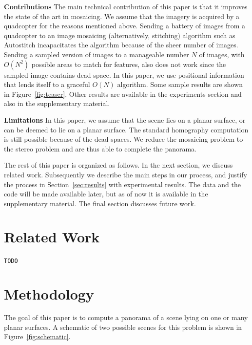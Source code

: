 \documentclass[10pt,twocolumn,letterpaper]{article}
\begin{document}
{\bf Contributions} The main technical contribution of this paper is
that it improves the state of the art in mosaicing.  We assume that
the imagery is acquired by a quadcopter for the reasons mentioned
above. Sending a battery of images from a quadcopter to an image
mosaicing (alternatively, stitching) algorithm such as Autostitch
incapacitates the algorithm because of the sheer number of
images. Sending a sampled version of images to a manageable number $N$
of images, with $O(N^2)$ possible areas to match for features, also
does not work since the sampled image contains dead space.  In this
paper, we use positional information that lends itself to a graceful
$O(N)$ algorithm.  Some sample results are shown in Figure~\ref{fig:teaser}.
Other results are available in the experiments section and also in the
supplementary material.

{\bf Limitations} In this paper, we assume that the scene lies on a
planar surface, or can be deemed to lie on a planar surface. The
standard homography computation is still possible because of the dead
spaces.  We reduce the mosaicing problem to the stereo problem and are
thus able to complete the panorama.

The rest of this paper is organized as follows.  In the next section,
we discuss related work.  Subsequently we describe the main steps in
our process, and justify the process in Section~\ref{sec:results} with
experimental results.  The data and the code will be made available
later, but as of now it is available in the supplementary material.
The final section discusses future work.

\section{Related Work}
\verb+TODO+

\section{Methodology}

The goal of this paper is to compute a panorama of a scene lying on
one or many planar surfaces.  A schematic of two possible scenes for
this problem is shown in Figure~\ref{fig:schematic}.
\end{document}
